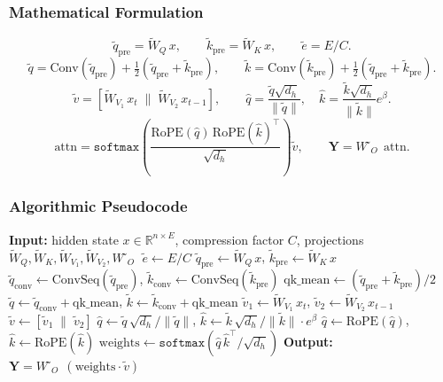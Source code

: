 \subsubsection{Mathematical Formulation}
\[
\tilde{q}_{\text{pre}} = \tilde{W}_Q\, x, \qquad \tilde{k}_{\text{pre}} = \tilde{W}_K\, x, \qquad \tilde{e} = E / C.
\]
\[
\tilde{q} = \text{Conv}(\tilde{q}_{\text{pre}}) + \tfrac{1}{2}(\tilde{q}_{\text{pre}} + \tilde{k}_{\text{pre}}), \qquad
\tilde{k} = \text{Conv}(\tilde{k}_{\text{pre}}) + \tfrac{1}{2}(\tilde{q}_{\text{pre}} + \tilde{k}_{\text{pre}}).
\]
\[
\tilde{v} = [\tilde{W}_{V_1}\, x_t \;\|\; \tilde{W}_{V_2}\, x_{t-1}], \qquad
\hat{q} = \frac{\tilde{q} \sqrt{d_h}}{\|\tilde{q}\|}, \quad \hat{k} = \frac{\tilde{k} \sqrt{d_h}}{\|\tilde{k}\|} e^{\beta}.
\]
\[
\text{attn} = \texttt{softmax}\!\left(\frac{\text{RoPE}(\hat{q})\, \text{RoPE}(\hat{k})^\top}{\sqrt{d_h}}\right) \tilde{v}, \qquad
\mathbf{Y} = W̃_O\, \text{attn}.
\]

\subsubsection{Algorithmic Pseudocode}
\begin{algorithmic}[1]
\State \textbf{Input:} hidden state $x \in \mathbb{R}^{n \times E}$, compression factor $C$, projections $\tilde{W}_Q, \tilde{W}_K, \tilde{W}_{V_1}, \tilde{W}_{V_2}, W̃_O$
\State $\tilde{e} \gets E / C$ 
\State $\tilde{q}_{\text{pre}} \gets \tilde{W}_Q\, x$, \quad $\tilde{k}_{\text{pre}} \gets \tilde{W}_K\, x$ 
\State $\tilde{q}_{\text{conv}} \gets \text{ConvSeq}(\tilde{q}_{\text{pre}})$, \quad $\tilde{k}_{\text{conv}} \gets \text{ConvSeq}(\tilde{k}_{\text{pre}})$ 
\State $\text{qk\_mean} \gets (\tilde{q}_{\text{pre}} + \tilde{k}_{\text{pre}}) / 2$ 
\State $\tilde{q} \gets \tilde{q}_{\text{conv}} + \text{qk\_mean}$, \quad $\tilde{k} \gets \tilde{k}_{\text{conv}} + \text{qk\_mean}$
\State $\tilde{v}_1 \gets \tilde{W}_{V_1}\, x_t$, \quad $\tilde{v}_2 \gets \tilde{W}_{V_2}\, x_{t-1}$ 
\State $\tilde{v} \gets [\tilde{v}_1 \;\|\; \tilde{v}_2]$ 
\State $\hat{q} \gets \tilde{q}\, \sqrt{d_h} / \|\tilde{q}\|$, \quad $\hat{k} \gets \tilde{k}\, \sqrt{d_h} / \|\tilde{k}\| \cdot e^{\beta}$ 
\State $\hat{q} \gets \text{RoPE}(\hat{q})$, \quad $\hat{k} \gets \text{RoPE}(\hat{k})$ 
\State $\text{weights} \gets \texttt{softmax}(\hat{q}\, \hat{k}^\top / \sqrt{d_h})$
\State \textbf{Output:} $\mathbf{Y} = W̃_O\, (\text{weights} \cdot \tilde{v})$
\end{algorithmic}

